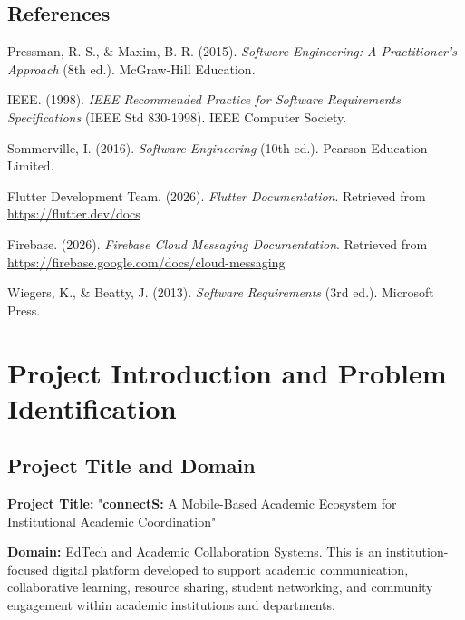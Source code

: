 \documentclass[12pt,a4paper]{article}
\begin{document}
\subsection{References}

\begin{enumerate}[leftmargin=*, label={[\arabic*]}, itemsep=5pt]
  \item Pressman, R. S., \& Maxim, B. R. (2015). \textit{Software Engineering: A Practitioner's Approach} (8th ed.). McGraw-Hill Education.
  \item IEEE. (1998). \textit{IEEE Recommended Practice for Software Requirements Specifications} (IEEE Std 830-1998). IEEE Computer Society.
  \item Sommerville, I. (2016). \textit{Software Engineering} (10th ed.). Pearson Education Limited.
  \item Flutter Development Team. (2026). \textit{Flutter Documentation}. Retrieved from \url{https://flutter.dev/docs}
  \item Firebase. (2026). \textit{Firebase Cloud Messaging Documentation}. Retrieved from \url{https://firebase.google.com/docs/cloud-messaging}
  \item Wiegers, K., \& Beatty, J. (2013). \textit{Software Requirements} (3rd ed.). Microsoft Press.
\end{enumerate}
\newpage

\newpage
\section{Project Introduction and Problem Identification}

\subsection{Project Title and Domain}

\textbf{Project Title:} "\textbf{connectS:} A Mobile-Based Academic Ecosystem for Institutional Academic Coordination"

\medskip
\textbf{Domain:} EdTech and Academic Collaboration Systems. This is an institution-focused digital platform developed to support academic communication, collaborative learning, resource sharing, student networking, and community engagement within academic institutions and departments.
\end{document}

